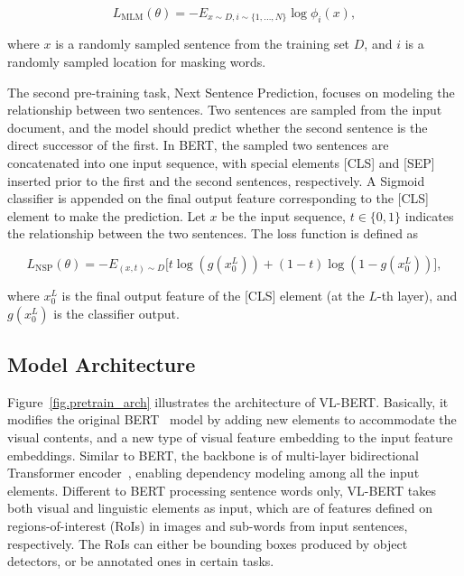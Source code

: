 \begin{equation}
L_{\text{MLM}}(\theta) = -E_{x\sim D, i\sim\{1,\ldots, N\}} \log \phi_i (x),
\end{equation}

where $x$ is a randomly sampled sentence from the training set $D$, and $i$ is a randomly sampled location for masking words. 

The second pre-training task, Next Sentence Prediction, focuses on modeling the relationship between two sentences. Two sentences are sampled from the input document, and the model should predict whether the second sentence is the direct successor of the first. In BERT, the sampled two sentences are concatenated into one input sequence, with special elements [CLS] and [SEP] inserted prior to the first and the second sentences, respectively. A Sigmoid classifier is appended on the final output feature corresponding to the [CLS] element to make the prediction. Let $x$ be the input sequence, $t\in\{0,1\}$ indicates the relationship between the two sentences. The loss function is defined as

\begin{equation}
L_{\text{NSP}}(\theta) = -E_{(x, t)\sim D} \big[t \log (g(x_0^L)) + (1-t) \log (1 - g(x_0^L))\big],
\end{equation}

where $x_0^L$ is the final output feature of the [CLS] element (at the $L$-th layer), and $g(x_0^L)$ is the classifier output. 

\subsection{Model Architecture}

Figure~\ref{fig.pretrain_arch} illustrates the architecture of VL-BERT. Basically, it modifies the original BERT~\citep{devlin2018bert} model by adding new elements to accommodate the visual contents, and a new type of visual feature embedding to the input feature embeddings. Similar to BERT, the backbone is of multi-layer bidirectional Transformer encoder~\citep{vaswani2017transformer}, enabling dependency modeling among all the input elements. Different to BERT processing sentence words only, VL-BERT takes both visual and linguistic elements as input, which are of features defined on regions-of-interest (RoIs) in images and sub-words from input sentences, respectively. The RoIs can either be bounding boxes produced by object detectors, or be annotated ones in certain tasks.

